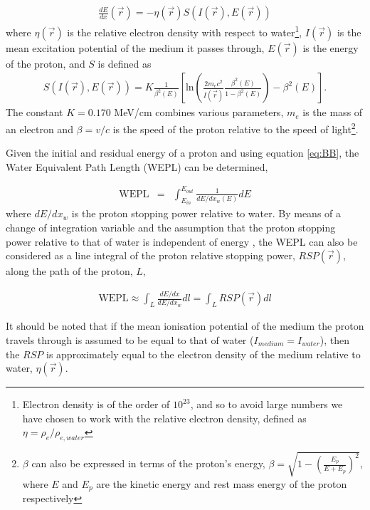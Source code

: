 \documentclass[11pt,a4paper]{article}
\begin{document}
\begin{eqnarray}
\frac{dE}{dx}(\vec{r}) = - \eta(\vec{r}) S(I(\vec{r}), E(\vec{r}))
\label{eq:BB}
\end{eqnarray}
where $\eta(\vec{r})$ is the relative electron density with respect to water\footnote{Electron density is of the order of $10^{23}$, and so to avoid large numbers we have chosen to work with the relative electron density, defined as $\eta = \rho_e/\rho_{e,water}$}, $I(\vec{r})$ is the mean excitation potential of the medium it passes through, $E(\vec{r})$ is the energy of the proton, and $S$ is defined as
\begin{eqnarray}
\label{eq:S}
S(I(\vec{r}),E(\vec{r})) = K \frac{1}{\beta^2(E)}\left[ \text{ln}\left(\frac{2m_ec^2}{I(\vec{r})}  \frac{\beta^2(E)}{1-\beta^2(E)}\right) - \beta^2(E)\right].
\end{eqnarray}
The constant $ K = 0.170$ MeV/cm combines various parameters, $m_{e}$ is the mass of an electron and $\beta = v/c$ is the speed of the proton relative to the speed of light\footnote{$\beta$ can also be expressed in terms of the proton's energy, $\beta = \sqrt{1 - \left(\frac{E_p}{E + E_p}\right)^2}$, where $E$ and $E_p$ are the kinetic energy and rest mass energy of the proton respectively}.

Given the initial and residual energy of a proton and using equation \ref{eq:BB}, the Water Equivalent Path Length (WEPL) can be determined,

\begin{eqnarray}
\text{WEPL} & =& \int_{E_{in}}^{E_{out}} \frac{1}{dE/dx_w(E)}dE  
\label{eq:WEPL}
\end{eqnarray}
where $dE/dx_{w}$ is the proton stopping power relative to water. By means of a change of integration variable and the assumption that the proton stopping power relative to that of water is independent of energy \parencite{schneider1996calibration}, the WEPL can also be considered as a line integral of the proton relative stopping power, $RSP(\vec{r})$, along the path of the proton, $L$,

\begin{eqnarray}
\text{WEPL} \approx  \int_L \frac{dE/dx}{dE/dx_{w}}dl = \int_L RSP(\vec{r}) dl
\label{eq:RSP}
\end{eqnarray}

It should be noted that if the mean ionisation potential of the medium the proton travels through is assumed to be equal to that of water ($I_{medium} = I_{water}$), then the $RSP$ is approximately equal to the electron density of the medium relative to water, $\eta(\vec{r})$.
\end{document}
